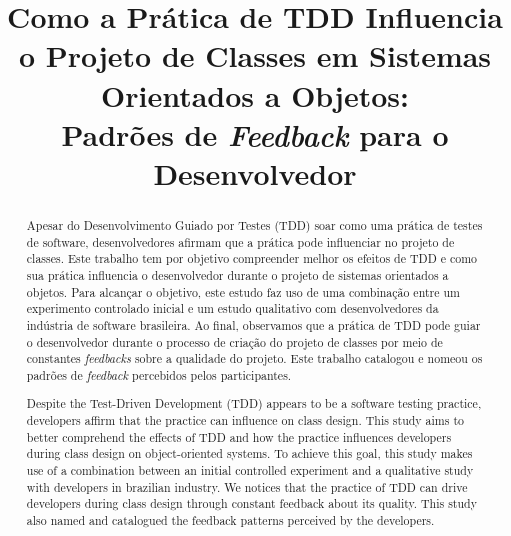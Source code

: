\documentclass[conference]{IEEEtran}
\begin{document}
	
\title{Como a Prática de TDD Influencia o Projeto de Classes em Sistemas Orientados a Objetos: \\Padrões de \textit{Feedback} para o Desenvolvedor}

\author{
}

\maketitle


\begin{abstract} 
	Apesar do Desenvolvimento Guiado por Testes (TDD) soar como uma prática de testes de software, 
	desenvolvedores afirmam que a prática pode influenciar no projeto de classes.
	Este trabalho tem por objetivo compreender melhor os efeitos de TDD e como sua prática 
	influencia o desenvolvedor durante o projeto de sistemas orientados a objetos.
	Para alcançar o objetivo, este estudo faz uso de uma combinação entre um experimento controlado 
	inicial e um estudo qualitativo com desenvolvedores da indústria de software brasileira.
	Ao final, observamos que a prática de TDD pode guiar o desenvolvedor durante o processo
	de criação do projeto de classes por meio de constantes \textit{feedbacks} sobre a qualidade
	do projeto. Este trabalho catalogou e nomeou os padrões de
	\textit{feedback} percebidos pelos participantes.
\end{abstract}

\vspace{0.2cm}

\begin{abstract} 
	Despite the Test-Driven Development (TDD) appears to be a software testing practice, 
	developers affirm that the practice can influence on class design. This study aims
	to better comprehend the effects of TDD and how the practice influences developers
	during class design on object-oriented systems. To achieve this goal, this study makes
	use of a combination between an initial controlled experiment and a qualitative study
	with developers in brazilian industry. We notices that the practice of TDD can drive
	developers during class design through constant feedback about its quality. This study
	also named and catalogued the feedback patterns perceived by the developers.
\end{abstract}
\end{document}
